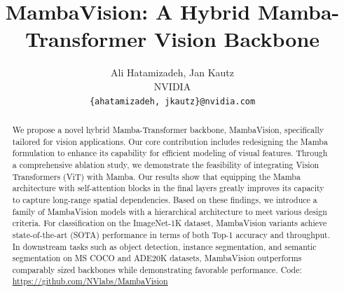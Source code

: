 \documentclass[10pt,twocolumn,letterpaper]{article}
\title{MambaVision: A Hybrid Mamba-Transformer Vision
Backbone}
\author{Ali Hatamizadeh, Jan Kautz \vspace{1mm} \\ 
NVIDIA\\
{\tt\small \{ahatamizadeh, jkautz\}@nvidia.com}
}
\begin{document}
\maketitle

\begin{abstract}
We propose a novel hybrid Mamba-Transformer backbone, MambaVision, specifically tailored for vision applications. Our core contribution includes redesigning the Mamba formulation to enhance its capability for efficient modeling of visual features. Through a comprehensive ablation study, we demonstrate the feasibility of integrating Vision Transformers (ViT) with Mamba. Our results show that equipping the Mamba architecture with self-attention blocks in the final layers greatly improves its capacity to capture long-range spatial dependencies. Based on these findings, we introduce a family of MambaVision models with a hierarchical architecture to meet various design criteria. For classification on the ImageNet-1K dataset, MambaVision variants achieve state-of-the-art (SOTA) performance in terms of both Top-1 accuracy and throughput. In downstream tasks such as object detection, instance segmentation, and semantic segmentation on MS COCO and ADE20K datasets, MambaVision outperforms comparably sized backbones while demonstrating favorable performance. Code:  \url{https://github.com/NVlabs/MambaVision}  
\end{abstract}
\end{document}

